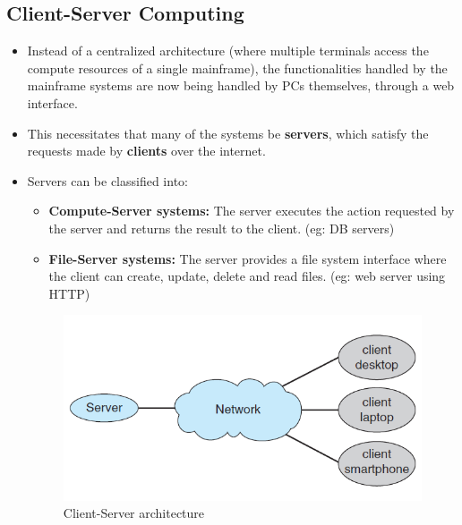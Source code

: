 \documentclass{article}
\theoremstyle{plain}
\theoremstyle{definition}
\begin{document}
\subsection{Client-Server Computing}
\begin{itemize}
    \item Instead of a centralized architecture (where multiple terminals access the compute resources of a single mainframe), the functionalities handled by the mainframe systems are now being handled by PCs themselves, through a web interface. 
    
    \item This necessitates that many of the systems be \textbf{servers}, which satisfy the requests made by \textbf{clients} over the internet. 
    
    \item Servers can be classified into:
    \begin{itemize}
        \item \textbf{Compute-Server systems:} The server executes the action requested by the server and returns the result to the client. (eg: DB servers)
        
        \item \textbf{File-Server systems:} The server provides a file system interface where the client can create, update, delete and read files. (eg: web server using HTTP)
    \end{itemize}
    
    \begin{figure}[h]
        \centering
        \includegraphics[scale=0.8]{os7.png}
        \caption{Client-Server architecture}
        \label{fig:my_label_7}
    \end{figure}
\end{itemize}
\end{document}
